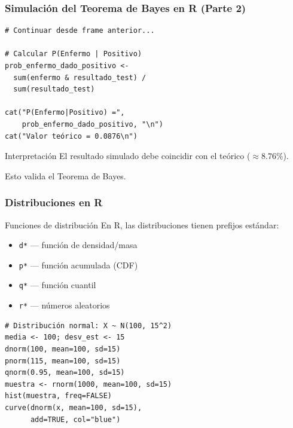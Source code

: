 \documentclass[aspectratio=169,11pt]{beamer}
\begin{document}
\begin{frame}[fragile]
\frametitle{Simulación del Teorema de Bayes en R (Parte 2)}

\begin{lstlisting}
# Continuar desde frame anterior...

# Calcular P(Enfermo | Positivo)
prob_enfermo_dado_positivo <-
  sum(enfermo & resultado_test) /
  sum(resultado_test)

cat("P(Enfermo|Positivo) =",
    prob_enfermo_dado_positivo, "\n")
cat("Valor teórico = 0.0876\n")
\end{lstlisting}

\pause
\begin{exampleblock}{Interpretación}
  El resultado simulado debe coincidir con el teórico (\(\approx 8.76\%\)).

  Esto valida el Teorema de Bayes.
\end{exampleblock}
\end{frame}

\begin{frame}[fragile]
\frametitle{Distribuciones en R}

\small

\begin{block}{Funciones de distribución}
En R, las distribuciones tienen prefijos estándar:
\begin{itemize}
  \item \texttt{d*} — función de densidad/masa
  \item \texttt{p*} — función acumulada (CDF)
  \item \texttt{q*} — función cuantil
  \item \texttt{r*} — números aleatorios
\end{itemize}
\end{block}

\pause
\begin{lstlisting}[basicstyle=\ttfamily\tiny]
# Distribución normal: X ~ N(100, 15^2)
media <- 100; desv_est <- 15
dnorm(100, mean=100, sd=15)
pnorm(115, mean=100, sd=15)
qnorm(0.95, mean=100, sd=15)
muestra <- rnorm(1000, mean=100, sd=15)
hist(muestra, freq=FALSE)
curve(dnorm(x, mean=100, sd=15),
      add=TRUE, col="blue")
\end{lstlisting}
\end{frame}

\end{document}
